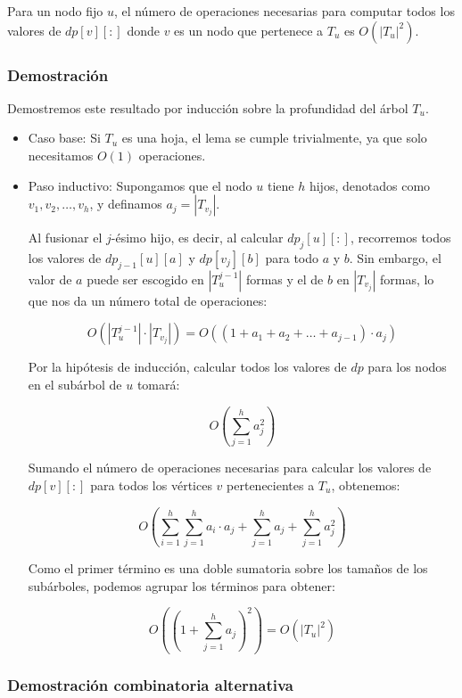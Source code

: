 \documentclass[a4paper, 12pt]{article}
\begin{document}
Para un nodo fijo $u$, el número de operaciones necesarias para computar todos los valores de 
$dp[v][:]$ donde $v$ es un nodo que pertenece a $T_u$ es $O(|T_u|^2)$.

\subsubsection{Demostración}

Demostremos este resultado por inducción sobre la profundidad del árbol $T_u$. 

\begin{itemize}
    \item Caso base: Si $T_u$ es una hoja, el lema se cumple trivialmente, ya que solo necesitamos $O(1)$ operaciones.
    \item Paso inductivo: Supongamos que el nodo $u$ tiene $h$ hijos, denotados como $v_1, v_2, \dots, v_h$, y definamos $a_j = |T_{v_j}|$.
    
    Al fusionar el $j$-ésimo hijo, es decir, al calcular $dp_j[u][:]$, recorremos todos los valores de $dp_{j-1}[u][a]$ y 
    $dp[v_j][b]$ para todo $a$ y $b$. Sin embargo, el valor de $a$ puede ser escogido en $|T_u^{j-1}|$ formas y el de $b$ en 
    $|T_{v_j}|$ formas, lo que nos da un número total de operaciones:

    \[
    O(|T_u^{j-1}| \cdot |T_{v_j}|) = O\left( (1 + a_1 + a_2 + \dots + a_{j-1}) \cdot a_j \right)
    \]

    Por la hipótesis de inducción, calcular todos los valores de $dp$ para los nodos en el subárbol de $u$ tomará:

    \[
    O\left( \sum_{j=1}^{h} a_j^2 \right)
    \]

    Sumando el número de operaciones necesarias para calcular los valores de $dp[v][:]$ para todos los vértices $v$ pertenecientes a $T_u$, obtenemos:

    \[
    O\left( \sum_{i=1}^{h} \sum_{j=1}^{h} a_i \cdot a_j + \sum_{j=1}^{h} a_j + \sum_{j=1}^{h} a_j^2 \right)
    \]

    Como el primer término es una doble sumatoria sobre los tamaños de los subárboles, podemos agrupar los términos para obtener:

    \[
    O\left( \left( 1 + \sum_{j=1}^{h} a_j \right)^2 \right) = O(|T_u|^2)
    \]

\end{itemize}

\subsubsection{Demostración combinatoria alternativa}
\end{document}
